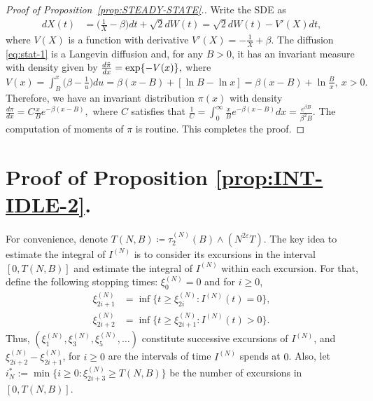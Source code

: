 \documentclass[11pt, reqno]{article}
\numberwithin{equation}{section}
\numberwithin{theorem}{section}
\begin{document}
\begin{proof}[Proof of Proposition~\ref{prop:STEADY-STATE}.]
Write the SDE as
\begin{align}\label{eq:stat-1}
        dX(t)&=\Big(\frac{1}{X}-\beta \Big)dt+\sqrt{2}dW(t)
        =\sqrt{2}dW(t)-V'(X)dt,
\end{align}
where $V(X)$ is a function with derivative 
$
    V'(X)=-\frac{1}{X}+\beta.
$
The diffusion \eqref{eq:stat-1} is a Langevin diffusion and, for any $B>0$, it has an invariant measure with density given by 
$\frac{d\Tilde{\pi}}{dx}=\exp\{-V(x)\},$ where
$
    V(x)=\int_{B}^{x}\Big(\beta-\frac{1}{u}\Big)du
    =\beta(x-B)+[\ln{B}-\ln{x}]
    =\beta(x-B)+\ln{\frac{B}{x}}, \ x >0.
$
Therefore, we have an invariant distribution $\pi(x)$ with density
$
    \frac{d\pi}{dx}=C\frac{x}{B}e^{-\beta (x-B)},
$
where $C$ satisfies that $\frac{1}{C}=\int_0^{\infty} \frac{x}{B}e^{-\beta (x-B)}dx=\frac{e^{\beta B}}{\beta^2 B}$. The computation of moments of $\pi$ is routine. This completes the proof.
\end{proof}


\section{Proof of Proposition \ref{prop:INT-IDLE-2}.}
\label{sec:proof-prop-5.2}
For convenience, denote $T(N,B)\coloneqq \tau^{(N)}_2(B)\wedge (N^{2\varepsilon}T) $.
The key idea to estimate the integral of $I^{(N)}$ is to consider its excursions in the interval $[0,  T(N,B)]$ and estimate the integral of  $I^{(N)}$ within each excursion.
For that, define the following stopping times: $\xi^{(N)}_0=0$ and for $i\geq 0$,
\begin{equation}\label{eq:xi-i-def}
    \begin{split}
        \xi^{(N)}_{2i+1}&=\inf\big\{t\geq\xi^{(N)}_{2i}:I^{(N)}(t)=0\big\},\\
    \xi^{(N)}_{2i+2}&=\inf\big\{t\geq\xi^{(N)}_{2i+1}:I^{(N)}(t)>0\big\}.
    \end{split}
\end{equation}
Thus, $(\xi_1^{(N)}, \xi_3^{(N)}, \xi_5^{(N)},\ldots)$ constitute successive excursions of $I^{(N)}$, and $\xi_{2i+2}^{(N)} - \xi_{2i+1}^{(N)}$, for $i\geq 0$ are the intervals of time $I^{(N)}$ spends at $0$.
Also, let $i^*_N:=\min \big\{i\geq 0: \xi^{(N)}_{2i+3}\geq T(N,B) \big\}$ be the number of excursions in $[0,  T(N,B)]$. 
\end{document}
